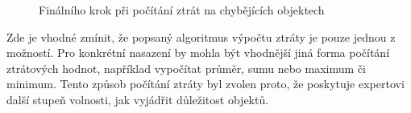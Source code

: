 \begin{figure}[ht!]
	\centering
	\caption{Finálního krok při počítání ztrát na chybějících objektech}\label{fig:example_missing_objects_final_sum}
\end{figure}

Zde je vhodné zmínit, že popsaný algoritmus výpočtu ztráty je pouze jednou z možností.
Pro konkrétní nasazení by mohla být vhodnější jiná forma počítání ztrátových hodnot,
například vypočítat průměr, sumu nebo maximum či minimum.
Tento způsob počítání ztráty byl zvolen proto, že poskytuje expertovi další stupeň volnosti,
jak vyjádřit důležitost objektů.

